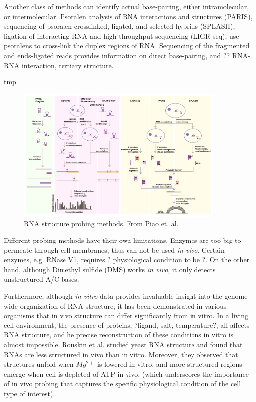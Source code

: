 \documentclass{proposal}
\begin{document}
Another class of methods can identify actual base-pairing, either intramolecular, or intermolecular.
Psoralen analysis of RNA interactions and structures (PARIS),
sequencing of psoralen crosslinked, ligated, and selected hybrids (SPLASH),
ligation of interacting RNA and high-throughput sequencing (LIGR-seq),
use psoralens to cross-link the duplex regions of RNA.
Sequencing of the fragmented and ends-ligated reads provides information on direct base-pairing,
and ??
RNA-RNA interaction, tertiary structure.


tmp\cite{piao2017rna}

\begin{figure}[h!]
    \centering
    \includegraphics[width=0.9\textwidth]{probing_methods.png}
    \caption{RNA structure probing methods. From Piao et. al\cite{piao2017rna}.}
    \label{fig:probing_methods}
    \centering
\end{figure}



Different probing methods have their own limitations.
Enzymes are too big to ﻿permeate through cell membranes, thus can not be used \textit{in vivo}.
Certain enzymes, e.g. ﻿RNase V1, requires ? physiological condition to be ?.
On the other hand, although ﻿Dimethyl sulfide (DMS) works \textit{in vivo},
it only detects unstructured A/C bases.


Furthermore, although \textit{in vitro} data provides invaluable insight into the genome-wide organization of RNA structure,
it has been demonstrated in various organisms that in vivo structure can differ significantly from in vitro.
In a living cell environment, the presence of proteins,  ?ligand, salt, temperature?, all affects RNA structure,
and he precise reconstruction of these conditions in vitro is almost impossible.
﻿Rouskin et al.\cite{rouskin2014genome} studied yeast RNA structure and found that RNAs are less structured in vivo than in vitro.
Moreover, they observed that structures unfold when $Mg^{2+}$ is lowered in vitro,
and more structured regions emerge when cell is depleted of ATP in vivo.
(which underscores the importance of in vivo probing that captures the specific physiological condition of the cell type of interest)
\end{document}
